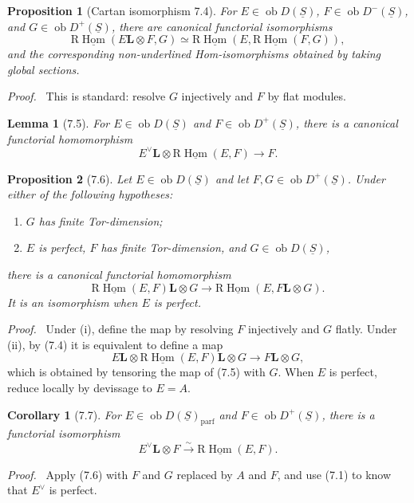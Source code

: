 \documentclass[13pt]{extarticle}
\newcommand{\uS}{\underline S}
\newcommand{\ob}{\operatorname{ob}}
\newcommand{\RHom}{\mathrm R\underline{\operatorname{Hom}}}
\newcommand{\bbL}{\mathbin{\mathbf L\!\otimes}}
\newcommand{\iso}{\xrightarrow{\sim}}
\newenvironment{prooftext}[1][Proof]{\par\noindent\emph{#1.}\ }{\par\medskip}
\newtheorem*{lemma*}{Lemma}
\newtheorem*{proposition*}{Proposition}
\newtheorem*{corollary*}{Corollary}
\begin{document}
\begin{proposition*}[Cartan isomorphism 7.4]
For $E\in\ob D(\uS)$, $F\in\ob D^-(\uS)$, and $G\in\ob D^+(\uS)$, there are canonical functorial isomorphisms
\[
\RHom(E\bbL F,G)\simeq\RHom(E,\RHom(F,G)),
\]
and the corresponding non-underlined Hom-isomorphisms obtained by taking global sections.
\end{proposition*}

\begin{prooftext}
This is standard: resolve $G$ injectively and $F$ by flat modules.
\end{prooftext}

\begin{lemma*}[7.5]
For $E\in\ob D(\uS)$ and $F\in\ob D^+(\uS)$, there is a canonical functorial homomorphism
\[
E^\vee\bbL \RHom(E,F)\longrightarrow F.
\]
\end{lemma*}

\begin{proposition*}[7.6]
Let $E\in\ob D(\uS)$ and let $F,G\in\ob D^+(\uS)$. Under either of the following hypotheses:
\begin{enumerate}[label=(\roman*)]
\item $G$ has finite Tor-dimension;
\item $E$ is perfect, $F$ has finite Tor-dimension, and $G\in\ob D(\uS)$,
\end{enumerate}
there is a canonical functorial homomorphism
\[
\RHom(E,F)\bbL G\longrightarrow\RHom(E,F\bbL G).
\]
It is an isomorphism when $E$ is perfect.
\end{proposition*}

\begin{prooftext}
Under (i), define the map by resolving $F$ injectively and $G$ flatly. Under (ii), by (7.4) it is equivalent to define a map
\[
E\bbL\RHom(E,F)\bbL G\longrightarrow F\bbL G,
\]
which is obtained by tensoring the map of (7.5) with $G$. When $E$ is perfect, reduce locally by devissage to $E=A$.
\end{prooftext}

\begin{corollary*}[7.7]
For $E\in\ob D(\uS)_{\mathrm{parf}}$ and $F\in\ob D^+(\uS)$, there is a functorial isomorphism
\[
E^\vee\bbL F\iso\RHom(E,F).
\]
\end{corollary*}

\begin{prooftext}
Apply (7.6) with $F$ and $G$ replaced by $A$ and $F$, and use (7.1) to know that $E^\vee$ is perfect.
\end{prooftext}
\end{document}
